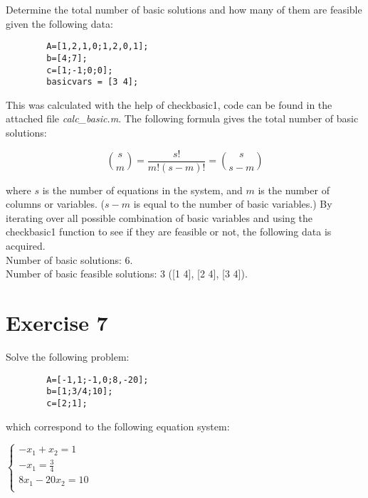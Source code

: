 \documentclass{article}
\begin{document}
    Determine the total number of basic solutions and how many of them are
    feasible given the following data:

    \begin{lstlisting}
        A=[1,2,1,0;1,2,0,1];
        b=[4;7];
        c=[1;-1;0;0];
        basicvars = [3 4];
    \end{lstlisting}

    \noindent
    This was calculated with the help of checkbasic1, code can be found in the
    attached file \textit{calc\_basic.m}.
    The following formula gives the total number of basic solutions:

    \begin{equation}
        \binom{s}{m} = \frac{s!}{m!(s - m)!} = \binom{s}{s-m}
    \end{equation}

    \noindent
    where $s$ is the number of equations in the system, and $m$ is the number
    of columns or variables. ($s - m$ is equal to the number of
    basic variables.) By iterating over all possible combination of basic
    variables and using the checkbasic1 function to see if they are feasible or
    not, the following data is acquired. \\

    \noindent
    Number of basic solutions: 6. \\
    Number of basic feasible solutions: 3 ([1 4], [2 4], [3 4]).

\section*{Exercise 7}

    Solve the following problem:

    \begin{lstlisting}
        A=[-1,1;-1,0;8,-20];
        b=[1;3/4;10];
        c=[2;1];
    \end{lstlisting}

    which correspond to the following equation system:

    \begin{center}
        \begin{math}
            \begin{cases}
                -x_1 + x_2 = 1 \\
                -x_1 = \frac{3}{4} \\
                8x_1 - 20x_2 = 10 \\
            \end{cases}
        \end{math}
    \end{center}
\end{document}
